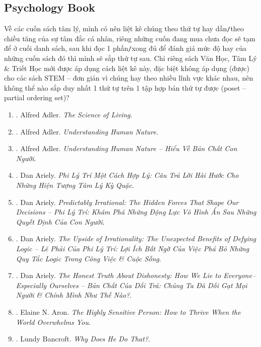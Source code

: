 \documentclass{article}
\begin{document}
\subsection{Psychology Book}
Về các cuốn sách tâm lý, mình có nên liệt kê chúng theo thứ tự hay dần\texttt{/}theo chiều tăng của sự tâm đắc cá nhân, riêng những cuốn đang mua chưa đọc sẽ tạm để ở cuối danh sách, sau khi đọc 1 phần\texttt{/}xong đủ để đánh giá mức độ hay của những cuốn sách đó thì mình sẽ sắp thứ tự sau. Chỉ riêng sách Văn Học, Tâm Lý \& Triết Học mới được áp dụng cách liệt kê này, đặc biệt không áp dụng (được) cho các sách STEM -- đơn giản vì chúng hay theo nhiều lĩnh vực khác nhau, nên không thể nào sắp duy nhất 1 thứ tự trên 1 tập hợp bán thứ tự được (poset -- partial ordering set)?
\begin{enumerate}
	\item \cite{Adler_science_living}. Alfred Adler. {\it The Science of Living}.\hfill{\sf[done]}
	\item \cite{Adler_human_nature}. {\sc Alfred Adler}. {\it Understanding Human Nature}.\hfill{\sf[done]}
	\item \cite{Adler_human_nature_VN}. {\sc Alfred Adler}. {\it Understanding Human Nature -- Hiểu Về Bản Chất Con Người}.\hfill{\sf[done]}	
	\item \cite{Ariely_reasonably_irrational}. Dan Ariely. {\it Phi Lý Trí Một Cách Hợp Lý: Câu Trả Lời Hài Hước Cho Những Hiện Tượng Tâm Lý Kỳ Quặc}.\hfill{\sf[done]}
	\item \cite{Ariely_predictably_irrational}. Dan Ariely. {\it Predictably Irrational: The Hidden Forces That Shape Our Decisions -- Phi Lý Trí: Khám Phá Những Động Lực Vô Hình Ẩn Sau Những Quyết Định Của Con Người}.\hfill{\sf[done]}
	\item \cite{Ariely_upside_rationality}. Dan Ariely. {\it The Upside of Irrationality: The Unexpected Benefits of Defying Logic -- Lẽ Phải Của Phi Lý Trí: Lợi Ích Bất Ngờ Của Việc Phá Bỏ Những Quy Tắc Logic Trong Công Việc \& Cuộc Sống}.\hfill{\sf[done]}
	\item \cite{Ariely_dishonesty}. Dan Ariely. {\it The Honest Truth About Dishonesty: How We Lie to Everyone--Especially Ourselves -- Bản Chất Của Dối Trá: Chúng Ta Đã Dối Gạt Mọi Người \& Chính Mình Như Thế Nào?}.\hfill{\sf[done]}
	\item \cite{Aron_HSP}. Elaine N. Aron. {\it The Highly Sensitive Person: How to Thrive When the World Overwhelms You}.\hfill{\sf[done]}
	\item \cite{Bancroft_why_he_do}. Lundy Bancroft. {\it Why Does He Do That?}.\hfill{\sf[reading]}
	

\end{enumerate}
\end{document}
